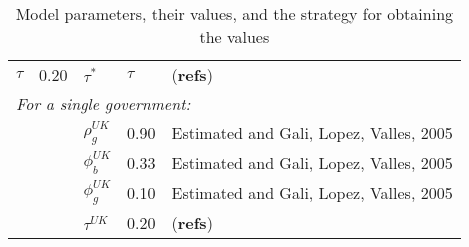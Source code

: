 \begin{table}[H]
\begin{tabular}{ll|lll}
        $\tau$ & 0.20 & $\tau^*$ & $\tau$ & (\textbf{refs})\\
        \multicolumn{5}{l}{\textit{For a single government:}} \\
         &&$\rho_g^{UK}$  & 0.90  & Estimated and Gali, Lopez, Valles, 2005\\
         &&$\phi_b^{UK}$  & 0.33  & Estimated and Gali, Lopez, Valles, 2005\\
         &&$\phi_g^{UK}$  & 0.10  & Estimated and Gali, Lopez, Valles, 2005\\
         &&$\tau^{UK}$    & 0.20  & (\textbf{refs})\\
    \end{tabular}
    \caption{Model parameters, their values, and the strategy for obtaining the values}
\end{table}


